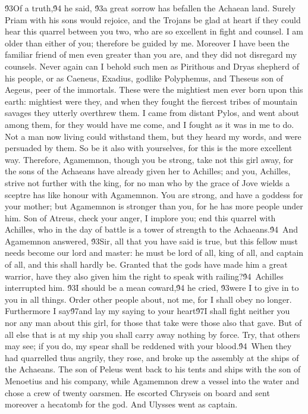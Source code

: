 {\'93Of a truth,\'94 he said, \'93a great sorrow has befallen the Achaean land. Surely Priam with his sons would rejoice, and the Trojans be glad at heart if they could hear this quarrel between you two, who are so excellent in fight and counsel. I am older than either of you; therefore be guided by me. Moreover I have been the familiar friend of men even greater than you are, and they did not disregard my counsels. Never again can I behold such men as Pirithous and Dryas shepherd of his people, or as Caeneus, Exadius, godlike Polyphemus, and Theseus son of Aegeus, peer of the immortals. These were the mightiest men ever born upon this earth: mightiest were they, and when they fought the fiercest tribes of mountain savages they utterly overthrew them. I came from distant Pylos, and went about among them, for they would have me come, and I fought as it was in me to do. Not a man now living could withstand them, but they heard my words, and were persuaded by them. So be it also with yourselves, for this is the more excellent way. Therefore, Agamemnon, though you be strong, take not this girl away, for the sons of the Achaeans have already given her to Achilles; and you, Achilles, strive not further with the king, for no man who by the grace of Jove wields a sceptre has like honour with Agamemnon. You are strong, and have a goddess for your mother; but Agamemnon is stronger than you, for he has more people under him. Son of Atreus, check your anger, I implore you; end this quarrel with Achilles, who in the day of battle is a tower of strength to the Achaeans.\'94\
And Agamemnon answered, \'93Sir, all that you have said is true, but this fellow must needs become our lord and master: he must be lord of all, king of all, and captain of all, and this shall hardly be. Granted that the gods have made him a great warrior, have they also given him the right to speak with railing?\'94\
Achilles interrupted him. \'93I should be a mean coward,\'94 he cried, \'93were I to give in to you in all things. Order other people about, not me, for I shall obey no longer. Furthermore I say\'97and lay my saying to your heart\'97I shall fight neither you nor any man about this girl, for those that take were those also that gave. But of all else that is at my ship you shall carry away nothing by force. Try, that others may see; if you do, my spear shall be reddened with your blood.\'94\
When they had quarrelled thus angrily, they rose, and broke up the assembly at the ships of the Achaeans. The son of Peleus went back to his tents and ships with the son of Menoetius and his company, while Agamemnon drew a vessel into the water and chose a crew of twenty oarsmen. He escorted Chryseis on board and sent moreover a hecatomb for the god. And Ulysses went as captain.\
}
